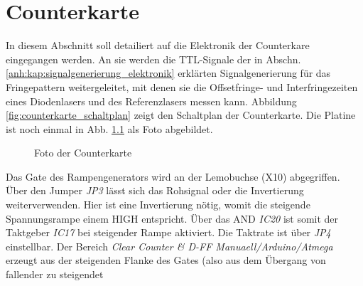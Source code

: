 \chapter{Counterkarte}\label{anh:kap:counterkarte}
In diesem Abschnitt soll detailiert auf die Elektronik der Counterkare
eingegangen werden. An sie werden die TTL-Signale der in Abschn.
\ref{anh:kap:signalgenerierung_elektronik} erklärten Signalgenerierung für das
Fringepattern weitergeleitet, mit denen sie die Offsetfringe- und
Interfringezeiten eines Diodenlasers und des Referenzlasers messen kann.
Abbildung \ref{fig:counterkarte_schaltplan} zeigt den Schaltplan der
Counterkarte. Die Platine ist noch einmal in Abb.
\ref{fig:counterkarte_foto} als Foto abgebildet.\par
\begin{figure}[h]
 	\centering
	\caption[Counterkarte -
	Foto]{Foto der Counterkarte}\label{fig:counterkarte_foto}
\end{figure}
Das Gate des Rampengenerators wird an der Lemobuchse (X10) abgegriffen.
Über den Jumper \textit{JP3} lässt sich das Rohsignal oder die Invertierung weiterverwenden.
Hier ist eine Invertierung nötig, womit die steigende Spannungsrampe einem HIGH entspricht.
Über das AND \textit{IC20} ist somit der Taktgeber \textit{IC17} bei steigender
Rampe aktiviert. Die Taktrate ist über \textit{JP4} einstellbar. Der Bereich
\textit{Clear Counter \& D-FF Manuaell/Arduino/Atmega} erzeugt aus der
steigenden Flanke des Gates (also aus dem Übergang von fallender zu steigendet
